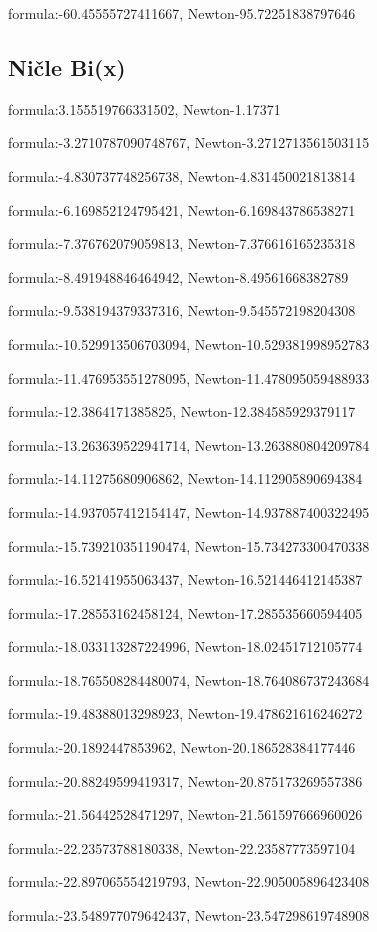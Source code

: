 \documentclass{article}
\begin{document}
formula:-60.45555727411667, Newton-95.72251838797646

\subsection{Ničle Bi(x)}
formula:3.155519766331502, Newton-1.17371

formula:-3.2710787090748767, Newton-3.2712713561503115

formula:-4.830737748256738, Newton-4.831450021813814

formula:-6.169852124795421, Newton-6.169843786538271

formula:-7.376762079059813, Newton-7.376616165235318

formula:-8.491948846464942, Newton-8.49561668382789

formula:-9.538194379337316, Newton-9.545572198204308

formula:-10.529913506703094, Newton-10.529381998952783

formula:-11.476953551278095, Newton-11.478095059488933

formula:-12.3864171385825, Newton-12.384585929379117

formula:-13.263639522941714, Newton-13.263880804209784

formula:-14.11275680906862, Newton-14.112905890694384

formula:-14.937057412154147, Newton-14.937887400322495

formula:-15.739210351190474, Newton-15.734273300470338

formula:-16.52141955063437, Newton-16.521446412145387

formula:-17.28553162458124, Newton-17.285535660594405

formula:-18.033113287224996, Newton-18.02451712105774

formula:-18.765508284480074, Newton-18.764086737243684

formula:-19.48388013298923, Newton-19.478621616246272

formula:-20.1892447853962, Newton-20.186528384177446

formula:-20.88249599419317, Newton-20.875173269557386

formula:-21.56442528471297, Newton-21.561597666960026

formula:-22.23573788180338, Newton-22.23587773597104

formula:-22.897065554219793, Newton-22.905005896423408

formula:-23.548977079642437, Newton-23.547298619748908
\end{document}
